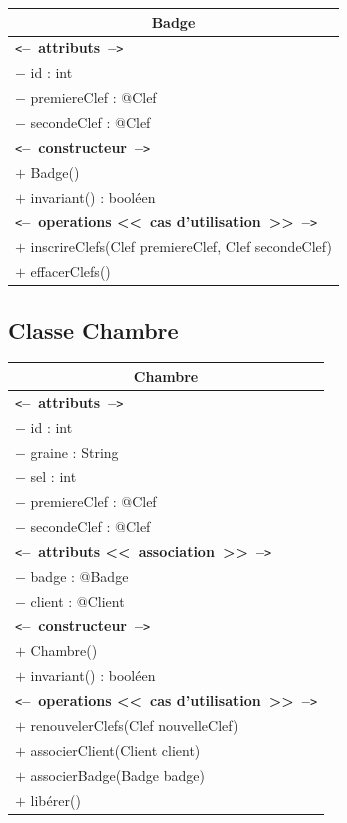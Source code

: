 \documentclass[11pt,article]{article}
\newcommand{\cmt}[1]{\texttt{<}\textbf{--~#1~--}\texttt{>}}
\begin{document}
\begin{center}
\begin{longtable}{|p{15cm}|}
\hline
\multicolumn{1}{|c|}{{\Large \textsf{Badge}}} \\
\hline
\cmt{attributs}\\
$-$ id : int \\
$-$ premiereClef : @Clef \\
$-$ secondeClef : @Clef \\
\hline
\cmt{constructeur} \\
$+$ Badge()\\
$+$ invariant() : booléen\\
\cmt{operations <<~cas d'utilisation~>>} \\
$+$ inscrireClefs(Clef premiereClef, Clef secondeClef) \\
$+$ effacerClefs() \\
\hline
\end{longtable}%
\end{center}
\newpage

\subsection{Classe \textsf{Chambre}}

\begin{center}
\begin{longtable}{|p{15cm}|}
\hline
\multicolumn{1}{|c|}{{\Large \textsf{Chambre}}} \\
\hline
\cmt{attributs}\\
$-$ id : int \\
$-$ graine : String \\
$-$ sel : int \\
$-$ premiereClef : @Clef \\
$-$ secondeClef : @Clef \\
\cmt{attributs <<~association~>>}\\
$-$ badge : @Badge \\
$-$ client : @Client \\
\hline
\cmt{constructeur} \\
$+$ Chambre()\\
$+$ invariant() : booléen\\
\cmt{operations <<~cas d'utilisation~>>} \\
$+$ renouvelerClefs(Clef nouvelleClef) \\
$+$ associerClient(Client client) \\
$+$ associerBadge(Badge badge) \\
$+$ libérer() \\
\hline
\end{longtable}%
\end{center}
\newpage
\end{document}
